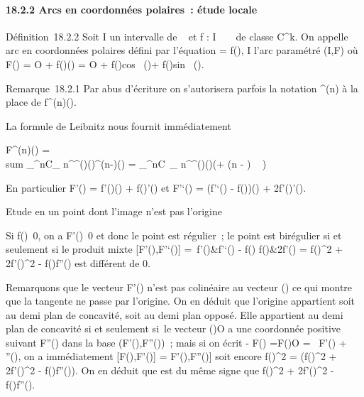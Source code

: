 \documentclass[]{article}
\begin{document}
\paragraph{18.2.2 Arcs en coordonnées polaires~: étude locale}

Définition~18.2.2 Soit I un intervalle de ~ et f : I \rightarrow~ ~ de classe
C^k. On appelle arc en coordonnées polaires défini par
l'équation \rho = f(\theta), \theta \in I l'arc paramétré (I,F) où F(\theta) = O +
f(\theta)\vecu(\theta) = O + f(\theta)cos~
(\theta)\vec\imath + f(\theta)sin~
(\theta).

Remarque~18.2.1 Par abus d'écriture on s'autorisera parfois la notation
\rho^(n) à la place de f^(n)(\theta).

La formule de Leibnitz nous fournit immédiatement

F^(n)(\theta) = \\sum
\_^nC\_
n^\jmathf^(\jmath)(\theta)\vecu^(n-\jmath)(\theta)
= \sum \_^nC~\_
n^\jmathf^(\jmath)(\theta)\vecu(\theta + (n - \jmath) \pi~
 )

En particulier F'(\theta) = f'(\theta)\vecu(\theta) +
f(\theta)\vecu'(\theta) et F'`(\theta) = (f'`(\theta) -
f(\theta))\vecu(\theta) + 2f'(\theta)\vecu'(\theta).

Etude en un point dont l'image n'est pas l'origine

Si f(\theta)\neq~0, on a
F'(\theta)\neq~0 et donc le point est régulier~; le
point est birégulier si et seulement si le produit mixte
{[}F'(\theta),F'`(\theta){]} = \left
\textbar{}\matrix\,f'(\theta)&f'`(\theta) - f(\theta)
\cr f(\theta)&2f'(\theta) \right \textbar{} =
f(\theta)^2 + 2f'(\theta)^2 - f(\theta)f''(\theta) est différent de 0.

Remarquons que le vecteur F'(\theta) n'est pas colinéaire au vecteur
\overrightarrowOF(\theta) ce qui montre que la tangente ne
passe \jmathamais par l'origine. On en déduit que l'origine appartient soit
au demi plan de concavité, soit au demi plan opposé. Elle appartient au
demi plan de concavité si et seulement si~le vecteur
\overrightarrowF(\theta)O a une coordonnée positive
suivant F''(\theta) dans la base (F'(\theta),F''(\theta))~; mais si on écrit - F(\theta)
=\overrightarrow F(\theta)O = \lambda~F'(\theta) + \muF''(\theta), on a
immédiatement {[}F(\theta),F'(\theta){]} = \mu{[}F'(\theta),F''(\theta){]} soit encore
f(\theta)^2 = \mu(f(\theta)^2 + 2f'(\theta)^2 -
f(\theta)f''(\theta)). On en déduit que \mu est du même signe que f(\theta)^2
+ 2f'(\theta)^2 - f(\theta)f''(\theta).
\end{document}

